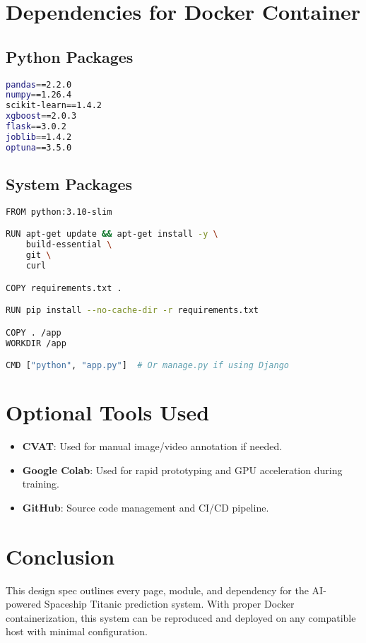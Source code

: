\documentclass[12pt]{article}
\begin{document}
\section{Dependencies for Docker Container}

\subsection{Python Packages}
\begin{lstlisting}[language=bash]
pandas==2.2.0
numpy==1.26.4
scikit-learn==1.4.2
xgboost==2.0.3
flask==3.0.2 
joblib==1.4.2
optuna==3.5.0
\end{lstlisting}

\subsection{System Packages}
\begin{lstlisting}[language=bash]
FROM python:3.10-slim

RUN apt-get update && apt-get install -y \
    build-essential \
    git \
    curl

COPY requirements.txt .

RUN pip install --no-cache-dir -r requirements.txt

COPY . /app
WORKDIR /app

CMD ["python", "app.py"]  # Or manage.py if using Django
\end{lstlisting}

\section{Optional Tools Used}
\begin{itemize}
    \item \textbf{CVAT}: Used for manual image/video annotation if needed.
    \item \textbf{Google Colab}: Used for rapid prototyping and GPU acceleration during training.
    \item \textbf{GitHub}: Source code management and CI/CD pipeline.
\end{itemize}

\section{Conclusion}
This design spec outlines every page, module, and dependency for the AI-powered Spaceship Titanic prediction system. With proper Docker containerization, this system can be reproduced and deployed on any compatible host with minimal configuration.
\end{document}
